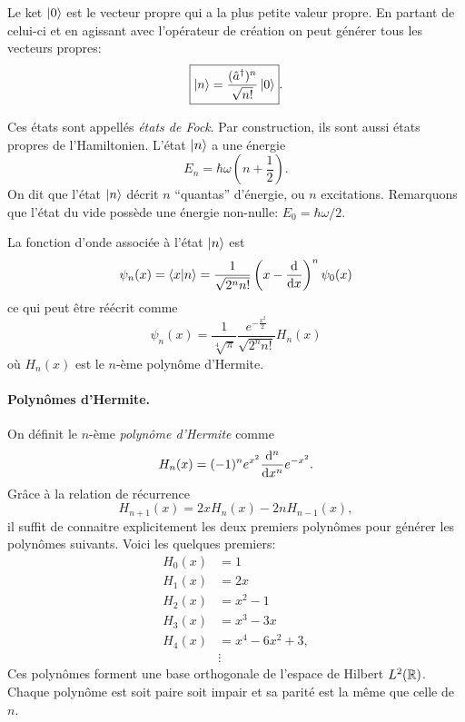 \documentclass[11pt,a4paper,oneside]{article}
\begin{document}
Le ket $\ket{0}$ est le vecteur propre qui a la plus petite valeur propre. En partant de celui-ci et en agissant avec l'opérateur de création on peut générer tous les vecteurs propres:
\begin{equation*}
    \boxed{\ket{n} = \frac{(\hat{a}^\dagger)^n}{\sqrt{n!}}\ket{0}}.
\end{equation*}

Ces états sont appellés \emph{états de Fock}. Par construction, ils sont aussi états propres de l'Hamiltonien. L'état $\ket{n}$ a une énergie
\begin{equation*}
    E_n = \hbar\omega\left(n+\frac{1}{2}\right).
\end{equation*}
On dit que l'état $\ket{n}$ décrit $n$ ``quantas'' d'énergie, ou $n$ excitations. Remarquons que l'état du vide possède une énergie non-nulle: $E_0=\hbar\omega/2$.

La fonction d'onde associée à l'état $\ket{n}$ est
\begin{equation*}
    \psi_n(x) = \braket{x}{n} = \frac{1}{\sqrt{2^nn!}}\left(x-\dv{x}\right)^n\psi_0(x)
\end{equation*}
ce qui peut être réécrit comme
\begin{equation*}
    \psi_n(x) = \frac{1}{\sqrt[4]{\pi}}\frac{e^{-\frac{x^2}{2}}}{\sqrt{2^nn!}}H_n(x)
\end{equation*}
où $H_n(x)$ est le $n$-ème polynôme d'Hermite.

\paragraph*{Polynômes d'Hermite.} On définit le $n$-ème \emph{polynôme d'Hermite} comme
\begin{equation*}
    H_n(x)=(-1)^ne^{x^2}\dv[n]{x}e^{-x^2}.
\end{equation*}
Grâce à la relation de récurrence
\begin{equation*}
    H_{n+1}(x) = 2xH_n(x)-2nH_{n-1}(x),
\end{equation*} 
il suffit de connaitre explicitement les deux premiers polynômes pour générer les polynômes suivants. Voici les quelques premiers:
\begin{align*}
    H_0(x) &= 1 \\
    H_1(x) &= 2x \\
    H_2(x) &= x^2-1 \\
    H_3(x) &= x^3-3x \\
    H_4(x) &= x^4-6x^2+3,\\
    &\vdots
\end{align*}
Ces polynômes forment une base orthogonale de l'espace de Hilbert $L^2(\mathbb{R})$. Chaque polynôme est soit paire soit impair et sa parité est la même que celle de $n$.
\end{document}

